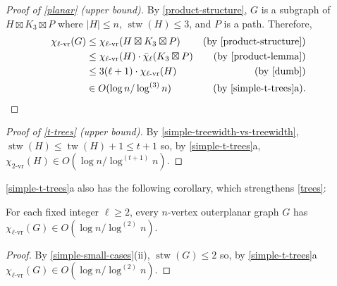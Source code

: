 \documentclass[kpfonts]{patmorin}
\DeclareMathOperator{\tw}{tw}
\DeclareMathOperator{\stw}{stw}
\newcommand{\rn}[1]{\chi_{\operatorname{#1-vr}}}
\newcommand{\trn}{\rn{2}}
\newcommand{\lrn}{\rn{\ell}}
\newcommand{\dlcn}{\bar{\chi}_\ell}
\theoremstyle{named}
\newcommand{\weirdref}[2]{\cref{#1}#2}
\begin{document}
\begin{proof}[Proof of \cref{planar} (upper bound)]
    By \cref{product-structure}, $G$ is a subgraph of $H\boxtimes K_3\boxtimes P$ where $|H|\le n$, $\stw(H)\le 3$, and $P$ is a path. Therefore,
    \begin{align*}
        \lrn(G) & \le \lrn(H\boxtimes K_3\boxtimes P)
                    & \text{(by \cref{product-structure})}\\
                & \le \lrn(H)\cdot \dlcn(K_3\boxtimes P)
                    & \text{(by \cref{product-lemma})} \\
                & \le 3(\ell+1)\cdot\lrn(H) & \text{(by \cref{dumb})} \\
                & \in O(\log n/\log^{(3)} n) & \text{(by \weirdref{simple-t-trees}{a}).} & \qedhere
    \end{align*}
\end{proof}

\begin{proof}[Proof of \cref{t-trees} (upper bound)]
    By \cref{simple-treewidth-vs-treewidth}, $\stw(H)\le\tw(H)+1\le t+1$ so, by   \weirdref{simple-t-trees}{a}, $\trn(H)\in O(\log n/\log^{(t+1)}n)$.
\end{proof}

\weirdref{simple-t-trees}{a} also has the following corollary, which strengthens \cref{trees}:

\begin{cor}\label{outerplanar}
    For each fixed integer $\ell\ge 2$, every $n$-vertex outerplanar graph $G$ has $\lrn(G)\in O(\log n/\log^{(2)} n)$.
\end{cor}

\begin{proof}
    By \cref{simple-small-cases}{(ii)}, $\stw(G)\le 2$ so, by \weirdref{simple-t-trees}{a} $\lrn(G)\in O(\log n/\log^{(2)} n)$.
\end{proof}
\end{document}
